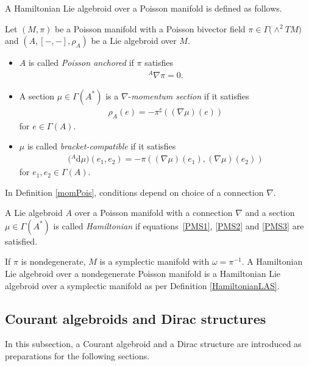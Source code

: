 \documentclass[10pt,a4paper]{amsart}
\numberwithin{equation}{section}
\newcommand{\rhoa}{{\rho_A}}
\newcommand{\rd}{\mathrm{d}}
\newcommand{\anabla}{{{}^A \nabla}}
\begin{document}
A Hamiltonian Lie algebroid over a Poisson manifold is defined as follows. \cite{Blohmann:2023}
\begin{Definition}\label{momPois}
Let $(M, \pi)$ be a Poisson manifold with a Poisson bivector field $\pi \in \Gamma\bigl(\wedge^2 TM\bigr)$
and $(A, [-,-], \rhoa)$ be a Lie algebroid over $M$.
\begin{itemize}\itemsep=0pt
\item[(P1)] $A$ is called \textit{Poisson anchored} if $\pi$ satisfies
\begin{gather}
\anabla \pi = 0.
\label{PMS1}
\end{gather}
\item[(P2)] A section $\mu \in \Gamma(A^*)$ is a $\nabla$-\textit{momentum section} if it satisfies
\begin{gather}
\rhoa(e) = - \pi^{\sharp} ((\nabla \mu)(e))\label{PMS2}
\end{gather}
for $e \in \Gamma(A)$.
\item[(P3)] $\mu$ is called \textit{bracket-compatible} if it satisfies
\begin{gather}
\bigl({}^A \rd \mu\bigr) (e_1, e_2) = - \pi((\nabla \mu)(e_1), (\nabla \mu)(e_2))\label{PMS3}
\end{gather}
for $e_1, e_2 \in \Gamma(A)$.
\end{itemize}
\end{Definition}
In Definition \ref{momPois}, conditions depend on choice of
a connection $\nabla$.

\begin{Definition}\label{HamiltonianLAP}
A Lie algebroid $A$ over a Poisson manifold with a connection $\nabla$ and a section~${\mu \in \Gamma(A^*)}$ is called \textit{Hamiltonian}
if equations~\eqref{PMS1}, \eqref{PMS2} and \eqref{PMS3}
are satisfied.
\end{Definition}
If $\pi$ is nondegenerate, $M$ is a symplectic manifold with
$\omega = \pi^{-1}$.
A Hamiltonian Lie algebroid over a nondegenerate Poisson manifold
is a Hamiltonian Lie algebroid over a symplectic manifold
as per Definition \ref{HamiltonianLAS}.

\subsection{Courant algebroids and Dirac structures}
In this subsection, a Courant algebroid and a Dirac structure \cite{Courant, LWX} are introduced
as preparations for the following sections.
\end{document}
